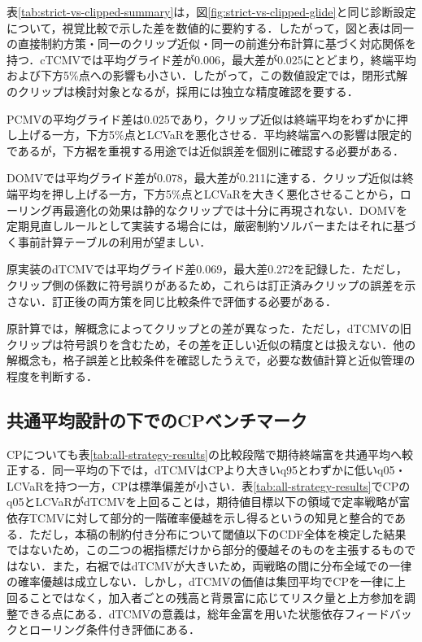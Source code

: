\documentclass[10pt,a4paper]{article}
\theoremstyle{plain}
\theoremstyle{definition}
\begin{document}
表\ref{tab:strict-vs-clipped-summary}は，図\ref{fig:strict-vs-clipped-glide}と同じ診断設定について，視覚比較で示した差を数値的に要約する．したがって，図と表は同一の直接制約方策・同一のクリップ近似・同一の前進分布計算に基づく対応関係を持つ．cTCMVでは平均グライド差が0.006，最大差が0.025にとどまり，終端平均および下方5\%点への影響も小さい．したがって，この数値設定では，閉形式解のクリップは検討対象となるが，採用には独立な精度確認を要する．

PCMVの平均グライド差は0.025であり，クリップ近似は終端平均をわずかに押し上げる一方，下方5\%点とLCVaRを悪化させる．平均終端富への影響は限定的であるが，下方裾を重視する用途では近似誤差を個別に確認する必要がある．

DOMVでは平均グライド差が0.078，最大差が0.211に達する．クリップ近似は終端平均を押し上げる一方，下方5\%点とLCVaRを大きく悪化させることから，ローリング再最適化の効果は静的なクリップでは十分に再現されない．DOMVを定期見直しルールとして実装する場合には，厳密制約ソルバーまたはそれに基づく事前計算テーブルの利用が望ましい．

原実装のdTCMVでは平均グライド差0.069，最大差0.272を記録した．ただし，クリップ側の係数に符号誤りがあるため，これらは訂正済みクリップの誤差を示さない．訂正後の両方策を同じ比較条件で評価する必要がある．

原計算では，解概念によってクリップとの差が異なった．ただし，dTCMVの旧クリップは符号誤りを含むため，その差を正しい近似の精度とは扱えない．他の解概念も，格子誤差と比較条件を確認したうえで，必要な数値計算と近似管理の程度を判断する．

\subsection{共通平均設計の下でのCPベンチマーク}

CPについても表\ref{tab:all-strategy-results}の比較段階で期待終端富を共通平均へ較正する．同一平均の下では，dTCMVはCPより大きいq95とわずかに低いq05・LCVaRを持つ一方，CPは標準偏差が小さい．表\ref{tab:all-strategy-results}でCPのq05とLCVaRがdTCMVを上回ることは，期待値目標以下の領域で定率戦略が富依存TCMVに対して部分的一階確率優越を示し得るという\citet{vanStadenDangForsyth2021}の知見と整合的である．ただし，本稿の制約付き分布について閾値以下のCDF全体を検定した結果ではないため，この二つの裾指標だけから部分的優越そのものを主張するものではない．また，右裾ではdTCMVが大きいため，両戦略の間に分布全域での一律の確率優越は成立しない．しかし，dTCMVの価値は集団平均でCPを一律に上回ることではなく，加入者ごとの残高と背景富に応じてリスク量と上方参加を調整できる点にある．dTCMVの意義は，総年金富を用いた状態依存フィードバックとローリング条件付き評価にある．
\end{document}
